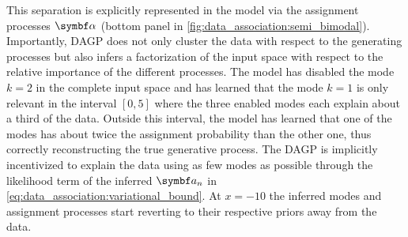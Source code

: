 This separation is explicitly represented in the model via the assignment processes $\mat{\alpha}$ (bottom panel in \cref{fig:data_association:semi_bimodal}).
Importantly, DAGP does not only cluster the data with respect to the generating processes but also infers a factorization of the input space with respect to the relative importance of the different processes.
The model has disabled the mode $k = 2$ in the complete input space and has learned that the mode $k = 1$ is only relevant in the interval $[0, 5]$ where the three enabled modes each explain about a third of the data.
Outside this interval, the model has learned that one of the modes has about twice the assignment probability than the other one, thus correctly reconstructing the true generative process.
The DAGP is implicitly incentivized to explain the data using as few modes as possible through the likelihood term of the inferred $\mat{a}_n$ in \cref{eq:data_association:variational_bound}.
At $x = -10$ the inferred modes and assignment processes start reverting to their respective priors away from the data.


